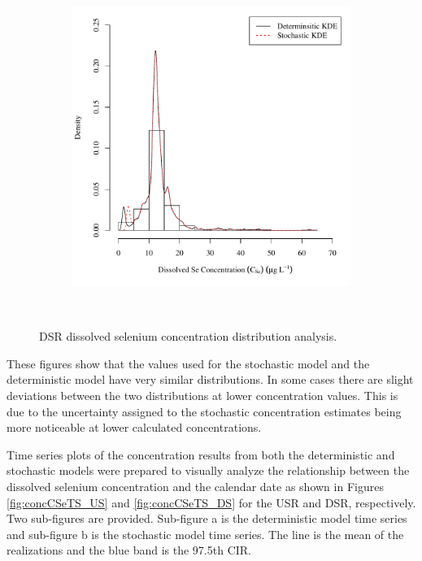 \begin{linenumbers}
\subfiguremid
\begin{landscape}
	\begin{figure}
		\begin{subfigure}{0.7\textwidth}
			\centering
			\includegraphics[width=\tableCustomSize]{"Figures/Results_DSR/Stochastic/c d&s est WIL"}
		\end{subfigure}\\
		\caption{DSR dissolved selenium concentration distribution analysis.}
	\end{figure}
\end{landscape}
\subfiguretop

These figures show that the values used for the stochastic model and the deterministic model have very similar distributions.  In some cases there are slight deviations between the two distributions at lower concentration values.  This is due to the uncertainty assigned to the stochastic concentration estimates being more noticeable at lower calculated concentrations.

Time series plots of the concentration results from both the deterministic and stochastic models were prepared to visually analyze the relationship between the dissolved selenium concentration and the calendar date as shown in Figures \ref{fig:concCSeTS_US} and \ref{fig:concCSeTS_DS} for the USR and DSR, respectively.  Two sub-figures are provided.  Sub-figure a is the deterministic model time series and sub-figure b is the stochastic model time series.  The line is the mean of the realizations and the blue band is the 97.5th CIR.


\end{linenumbers}
